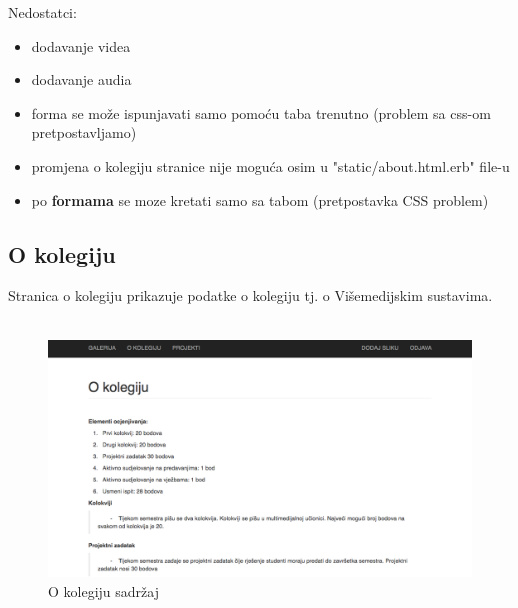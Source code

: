 \documentclass[]{article}
\begin{document}
\newpage

Nedostatci:
\begin{itemize}
	\item dodavanje videa
	\item dodavanje audia
	\item forma se može ispunjavati samo pomoću taba trenutno (problem sa css-om pretpostavljamo)
	\item promjena o kolegiju stranice nije moguća osim u "static/about.html.erb" file-u
	\item po \textbf{formama} se moze kretati samo sa tabom (pretpostavka CSS problem)
\end{itemize}
\newpage
\subsection{O kolegiju}
Stranica o kolegiju prikazuje podatke o kolegiju tj. o Višemedijskim sustavima.
\\
\\
\begin{figure}[h]
	\centering
	\includegraphics[scale=0.22]{o-kolegiju}
	\caption{O kolegiju sadržaj}
	\label{fig:mesh1}
\end{figure}
\end{document}
